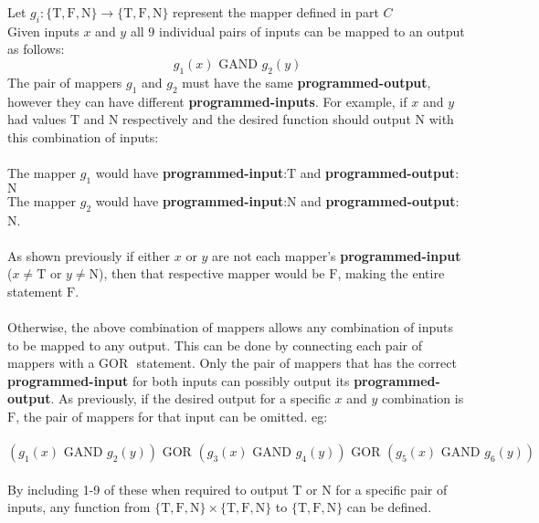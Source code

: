 \documentclass[11pt]{article}
\newcommand{\True}{\mbox{T}}
\newcommand{\False}{\mbox{F}}
\newcommand{\Neither}{\mbox{N}}
\newcommand{\gor}{\mbox{ GOR }}
\newcommand{\gand}{\mbox{ GAND }}
\begin{document}
\begin{enumerate}
\begin{enumerate}
\begin{solution}
Let $g_i: \{\True, \False, \Neither\} \rightarrow \{\True, \False, \Neither\}$ represent the mapper defined in part $C$\\
Given inputs $x$ and $y$ all $9$ individual pairs of inputs can be mapped to an output as follows:
$$g_1(x)\gand g_2(y)$$
The pair of mappers $g_1$ and $g_2$ must have the same \textbf{programmed-output}, however they can have different \textbf{programmed-inputs}. For example, if $x$ and $y$ had values $\True$ and $\Neither$ respectively and the desired function should output $\Neither$ with this combination of inputs:\\\\
The mapper $g_1$ would have \textbf{programmed-input}:$\True$ and \textbf{programmed-output}:$\Neither$\\
The mapper $g_2$ would have \textbf{programmed-input}:$\Neither$ and \textbf{programmed-output}:$\Neither$.\\\\
As shown previously if either $x$ or $y$ are not each mapper's \textbf{programmed-input} ($x \ne \True$ or $y\ne \Neither$), then that respective mapper would be $\False$, making the entire statement $\False$.\\\\
 Otherwise, the above combination of mappers allows any combination of inputs to be mapped to any output. This can be done by connecting each pair of mappers with a$\gor$ statement. Only the pair of mappers that has the correct \textbf{programmed-input} for both inputs can possibly output its \textbf{programmed-output}. As previously, if the desired output for a specific $x$ and $y$ combination is $\False$, the pair of mappers for that input can be omitted. eg:\\\\
$$(g_1(x)\gand g_2(y))\gor(g_3(x)\gand g_4(y))\gor(g_5(x)\gand g_6(y))$$\\
By including 1-9 of these when required to output $\True$ or $\Neither$ for a specific pair of inputs, any function from $\{ \True,\False,\Neither\} \times \{ \True,\False,\Neither\}$ to $\{ \True,\False,\Neither\}$ can be defined.
\end{solution}
\end{enumerate}
\end{enumerate}
\end{document}
